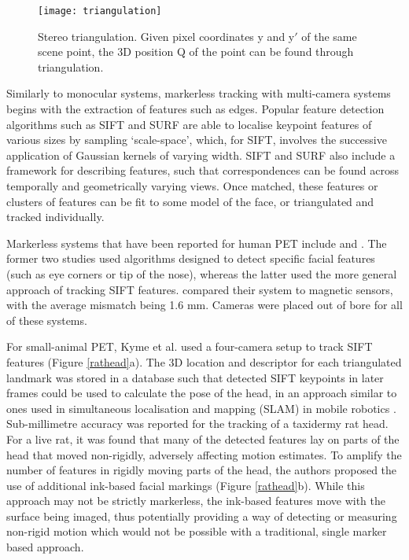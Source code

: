 \documentclass[class=article, crop=false]{standalone}
\begin{document}
\begin{figure}
	\centering
	\texttt{[image: triangulation]}
	\caption{Stereo triangulation. Given pixel coordinates y and y$'$ of the same scene point, the 3D position Q of the point can be found through triangulation.}
	\label{triangulation}
\end{figure}

\par 
Similarly to monocular systems, markerless tracking with multi-camera systems begins with the extraction of features such as edges. Popular feature detection algorithms such as SIFT \parencite{Lowe2004} and SURF \parencite{Bay2008} are able to localise keypoint features of various sizes by sampling `scale-space', which, for SIFT, involves the successive application of Gaussian kernels of varying width. SIFT and SURF  also include a framework for describing features, such that correspondences can be found across temporally and geometrically varying views. Once matched, these features or clusters of features can be fit to some model of the face, or triangulated and tracked individually.
\par 
Markerless systems that have been reported for human PET include \cite{Anishchenko2015,Gao2007} and \cite{Ma2008}. The former two studies used algorithms designed to detect specific facial features (such as eye corners or tip of the nose), whereas the latter used the more general approach of tracking SIFT features. \cite{Anishchenko2015} compared their system to magnetic sensors, with the average mismatch being 1.6 mm. Cameras were placed out of bore for all of these systems.
\par
For small-animal PET, Kyme et al. \parencite*{Kyme2014} used a four-camera setup to track SIFT features (Figure \ref{rathead}a). The 3D location and descriptor for each triangulated landmark was stored in a database such that detected SIFT keypoints in later frames could be used to calculate the pose of the head, in an approach similar to ones used in simultaneous localisation and mapping (SLAM) in mobile robotics \parencite{Se2002,Se2005}. Sub-millimetre accuracy was reported for the tracking of a taxidermy rat head. For a live rat, it was found that many of the detected features lay on parts of the head that moved non-rigidly, adversely affecting motion estimates. To amplify the number of features in rigidly moving parts of the head, the authors proposed the use of additional ink-based facial markings (Figure \ref{rathead}b). While this approach may not be strictly markerless, the ink-based features move with the surface being imaged, thus potentially providing a way of detecting or measuring non-rigid motion which would not be possible with a traditional, single marker based approach.
\end{document}
